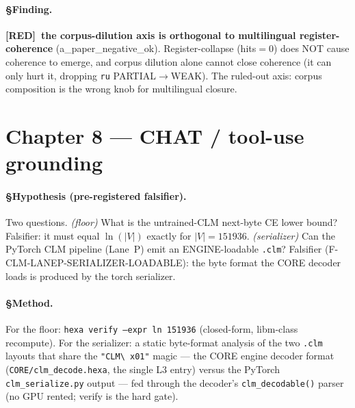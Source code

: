 \documentclass[11pt,a4paper]{article}
\providecommand{\tierRed}{[RED]}
\begin{document}
\paragraph{§Finding.} \textbf{\tierRed\ the corpus-dilution axis is orthogonal to
multilingual register-coherence} (a\_paper\_negative\_ok). Register-collapse
(hits$=0$) does NOT cause coherence to emerge, and corpus dilution alone cannot
close coherence (it can only hurt it, dropping \texttt{ru} PARTIAL$\to$WEAK). The
ruled-out axis: corpus composition is the wrong knob for multilingual closure.

\section{Chapter 8 --- CHAT / tool-use grounding}
\label{sec:chat}

\paragraph{§Hypothesis (pre-registered falsifier).} Two questions. \emph{(floor)}
What is the untrained-CLM next-byte CE lower bound? Falsifier: it must equal
$\ln(|V|)$ exactly for $|V|{=}151936$. \emph{(serializer)} Can the PyTorch CLM
pipeline (Lane~P) emit an ENGINE-loadable \texttt{.clm}? Falsifier
(F-CLM-LANEP-SERIALIZER-LOADABLE): the byte format the CORE decoder loads is
produced by the torch serializer.

\paragraph{§Method.} For the floor: \texttt{hexa verify --expr ln 151936}
(closed-form, libm-class recompute). For the serializer: a static byte-format
analysis of the two \texttt{.clm} layouts that share the \texttt{"CLM\textbackslash
x01"} magic --- the CORE engine decoder format (\texttt{CORE/clm\_decode.hexa}, the
single L3 entry) versus the PyTorch \texttt{clm\_serialize.py} output --- fed through
the decoder's \texttt{clm\_decodable()} parser (no GPU rented; verify is the hard
gate).
\end{document}
